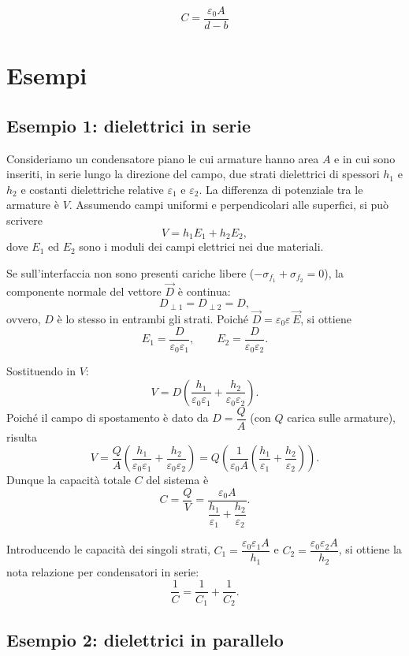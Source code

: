 \documentclass{book}
\begin{document}
$$
C = \frac{\varepsilon_0 A}{d-b}
$$






\section{Esempi}

\subsection*{Esempio 1: dielettrici in serie}

Consideriamo un condensatore piano le cui armature hanno area \(A\) e in cui sono inseriti, in serie lungo la direzione del campo, due strati dielettrici di spessori \(h_1\) e \(h_2\) e costanti dielettriche relative \(\varepsilon_1\) e \(\varepsilon_2\). La differenza di potenziale tra le armature è \(V\). Assumendo campi uniformi e perpendicolari alle superfici, si può scrivere
\[
V = h_1 E_1 + h_2 E_2,
\]
dove \(E_1\) ed \(E_2\) sono i moduli dei campi elettrici nei due materiali.

Se sull'interfaccia non sono presenti cariche libere ($-\sigma_{{f}_{1}}+ \sigma_{{f}_{2}} = 0$), la componente normale del vettore \(\vec{D}\) è continua:
\[
D_{\perp1} = D_{\perp2} = D,
\]
ovvero, \(D\) è lo stesso in entrambi gli strati. Poiché \(\vec{D}=\varepsilon_0\varepsilon\,\vec{E}\), si ottiene
\[
E_1 = \frac{D}{\varepsilon_0\varepsilon_1},\qquad
E_2 = \frac{D}{\varepsilon_0\varepsilon_2}.
\]

Sostituendo in \(V\):
\[
V = D\left(\frac{h_1}{\varepsilon_0\varepsilon_1}+\frac{h_2}{\varepsilon_0\varepsilon_2}\right).
\]
Poiché il campo di spostamento è dato da \(D = \dfrac{Q}{A}\) (con \(Q\) carica sulle armature), risulta
\[
V = \frac{Q}{A}\left(\frac{h_1}{\varepsilon_0\varepsilon_1}+\frac{h_2}{\varepsilon_0\varepsilon_2}\right)
= Q\left(\frac{1}{\varepsilon_0 A}\left(\frac{h_1}{\varepsilon_1}+\frac{h_2}{\varepsilon_2}\right)\right).
\]
Dunque la capacità totale \(C\) del sistema è
\[
C=\frac{Q}{V}=\frac{\varepsilon_0 A}{\dfrac{h_1}{\varepsilon_1}+\dfrac{h_2}{\varepsilon_2}}.
\]

Introducendo le capacità dei singoli strati, \(C_1=\dfrac{\varepsilon_0\varepsilon_1 A}{h_1}\) e \(C_2=\dfrac{\varepsilon_0\varepsilon_2 A}{h_2}\), si ottiene la nota relazione per condensatori in serie:
\[
\frac{1}{C}=\frac{1}{C_1}+\frac{1}{C_2}.
\]

\subsection*{Esempio 2: dielettrici in parallelo}
\end{document}
